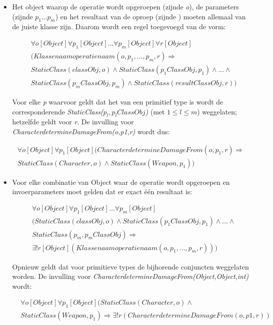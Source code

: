 \begin{itemize}
	\item Het object waarop de operatie wordt opgeroepen (zijnde \textit{o}), de parameters (zijnde \textit{$p_1 \ldots p_m$}) en het resultaat van de oproep (zijnde ) moeten allemaal van de juiste klasse zijn. Daarom wordt een regel toegevoegd van de vorm:
	
	\begin{align*}
	&\forall{o}[Object]\forall{p_1}[Object]\ldots\forall{p_m}[Object]\forall{r}[Object]
	\\
	&(Klassenaamoperatienaam(o,p_1,\ldots,p_m,r) \Rightarrow
	\\ 
	&StaticClass(classObj,o) \land StaticClass(p_{1}ClassObj,p_1) \land \ldots \land
	\\
	&StaticClass(p_{m}ClassObj,p_m) \land StaticClass(resultClassObj,r))
	\end{align*}
	
	Voor elke \textit{p} waarvoor geldt dat het van een primitief type is wordt de corresponderende \textit{StaticClass($p_l,p_{l}ClassObj$)} (met $1 \leq l \leq m$) weggelaten; hetzelfde geldt voor \textit{r}.
	De invulling voor \textit{CharacterdetermineDamageFrom(o,p1,r)} wordt dus:
	
	\begin{align*}
	\forall{o}[Object]\forall{p_1}[Object](CharacterdetermineDamageFrom(o,p_1,r) \Rightarrow \\
	StaticClass(Character,o) \land StaticClass(Weapon,p_1))
	\end{align*}
	
	\item Voor elke combinatie van Object waar de operatie wordt opgeroepen en invoerparameters moet gelden dat er exact \'e\'en resultaat is:
	
	\begin{align*}
	&\forall{o}[Object]\forall{p_1}[Object]\ldots\forall{p_m}[Object]
	\\
	&(StaticClass(classObj,o) \land StaticClass(p_{1}ClassObj,p_1) \land \ldots \land
	\\
	&StaticClass(p_m,p_{m}ClassObj) \Rightarrow
	\\
	&\exists!{r}[Object](Klassenaamoperatienaam(o,p_1,\ldots,p_m,r)))
	\end{align*}
	
	Opnieuw geldt dat voor primitieve types de bijhorende conjuncten weggelaten worden. De invulling voor \textit{CharacterdetermineDamageFrom(Object,Object,int)} wordt:
	
	\begin{align*}
	&\forall{o}[Object]\forall{p_1}[Object](StaticClass(Character,o) \land
	\\
	&StaticClass(Weapon,p_1) \Rightarrow \exists!{r}(CharacterdetermineDamageFrom(o,p1,r))
	\end{align*}
\end{itemize}

